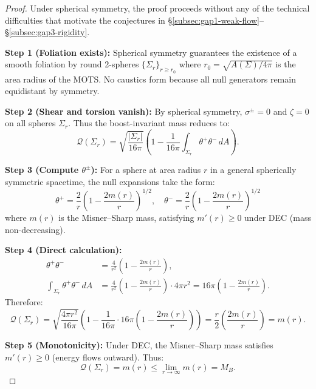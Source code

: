 \begin{proof}
Under spherical symmetry, the proof proceeds without any of the technical difficulties that motivate the conjectures in \S\ref{subsec:gap1-weak-flow}--\S\ref{subsec:gap3-rigidity}.

\textbf{Step 1 (Foliation exists):} Spherical symmetry guarantees the existence of a smooth foliation by round 2-spheres $\{\Sigma_r\}_{r \geq r_0}$ where $r_0 = \sqrt{A(\Sigma)/4\pi}$ is the area radius of the MOTS. No caustics form because all null generators remain equidistant by symmetry.

\textbf{Step 2 (Shear and torsion vanish):} By spherical symmetry, $\sigma^\pm = 0$ and $\zeta = 0$ on all spheres $\Sigma_r$. Thus the boost-invariant mass reduces to:
\begin{equation}
\mathcal{Q}(\Sigma_r) = \sqrt{\frac{|\Sigma_r|}{16\pi}}\left(1 - \frac{1}{16\pi}\int_{\Sigma_r} \theta^+\theta^- \, dA\right).
\end{equation}

\textbf{Step 3 (Compute $\theta^\pm$):} For a sphere at area radius $r$ in a general spherically symmetric spacetime, the null expansions take the form:
\begin{equation}
\theta^+ = \frac{2}{r}\left(1 - \frac{2m(r)}{r}\right)^{1/2}, \quad \theta^- = \frac{2}{r}\left(1 - \frac{2m(r)}{r}\right)^{1/2}
\end{equation}
where $m(r)$ is the Misner--Sharp mass, satisfying $m'(r) \geq 0$ under DEC (mass non-decreasing).

\textbf{Step 4 (Direct calculation):} 
\begin{align}
\theta^+\theta^- &= \frac{4}{r^2}\left(1 - \frac{2m(r)}{r}\right), \\
\int_{\Sigma_r} \theta^+\theta^- \, dA &= \frac{4}{r^2}\left(1 - \frac{2m(r)}{r}\right) \cdot 4\pi r^2 = 16\pi\left(1 - \frac{2m(r)}{r}\right).
\end{align}
Therefore:
\begin{equation}
\mathcal{Q}(\Sigma_r)
= \sqrt{\frac{4\pi r^2}{16\pi}}\left(1 - \frac{1}{16\pi}\cdot 16\pi\left(1 - \frac{2m(r)}{r}\right)\right)
= \frac{r}{2}\left(\frac{2m(r)}{r}\right)
= m(r).
\end{equation}

\textbf{Step 5 (Monotonicity):} Under DEC, the Misner--Sharp mass satisfies $m'(r) \geq 0$ (energy flows outward). Thus:
\begin{equation}
\mathcal{Q}(\Sigma_r) = m(r) \leq \lim_{r \to \infty} m(r) = M_B.
\end{equation}


\end{proof}
